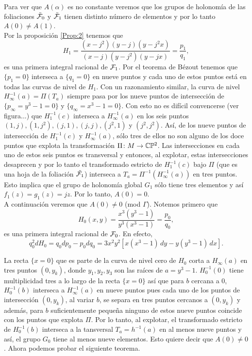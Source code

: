 Para ver que $A(\alpha)$ es no constante veremos que los grupos de holonomía de las foliaciones $\tilde{\mathcal{F}}_{0}$ y $\tilde{\mathcal{F}}_{1}$ tienen distinto número de elementos y por lo tanto $A(0)\neq A(1)$.\\

Por la proposición \ref{Prop:2} tenemos que $$H_{1}=\frac{(x-j^{2})(y-j)(y-j^{2}x)}{(x-j)(y-j^{2})(y-jx)}=\frac{p_{1}}{q_{1}},$$ es una primera integral racional de $\mathcal{F}_{1}$. Por el teorema de Bézout tenemos que $\{p_{1}=0\}$ interseca a $\{q_{1}=0\}$ en nueve puntos y cada uno de estos puntos está en todas las curvas de nivel de $H_{1}$. Con un razonamiento similar, la curva de nivel $H_{\infty}^{-1}(a)=\Pi(T_{a})$ siempre pasa por los nueve puntos de intersección de $\{p_{\infty}=y^{3}-1=0\}$ y $\{q_{\infty}=x^{3}-1=0\}$. Con esto no es difícil convencerse (ver figura...) que $H^{-1}_{1}(c)$ interseca a $H^{-1}_{\infty}(a)$ en los seis puntos $(1,j),(1,j^{2}),(j,1),(j,j),(j^{2},1)$ y $(j^{2},j^{2})$. Así, de los nueve puntos de intersección de $H^{-1}_{1}(c)$ y $H^{-1}_{\infty}(a)$, sólo tres de ellos no son alguno de los doce puntos que explota la transformación $\Pi\colon M\rightarrow\mathbb{C}\mathbb{P}^2$. Las intersecciones en cada uno de estos seis puntos es transversal y entonces, al explotar, estas intersecciones desaprecen y por lo tanto el transformado estricto de $H^{-1}_{1}(c)$ bajo $\Pi$ (que es una hoja de la foliación $\tilde{\mathcal{F}_{1}}$) interseca a $T_{a}=\Pi^{-1}(H^{-1}_{\infty}(a))$ en tres puntos. Esto implica que el grupo de holonomía global $G_{1}$ sólo tiene tres elementos y así $f_{1}(z)=g_{1}(z)=jz$. Por lo tanto, $A(0)=0$.\\

A continuación veremos que $A(0)\neq 0$ (mod $\Gamma$). Notemos primero que $$H_{0}(x,y)=\frac{x^{3}(y^{3}-1)}{y^{3}(x^{3}-1)}=\frac{p_{0}}{q_{0}},$$ es una primera integral racional de $\mathcal{F}_{0}$. En efecto, $$q_{0}^{2}dH_{0}=q_{0}dp_{0}-p_{0}dq_{0}=3x^{2}y^{2}[x(x^{3}-1)\, dy-y(y^{3}-1)\, dx].$$

La recta $\{x=0\}$ que es parte de la curva de nivel cero de $H_{0}$ corta a $H_{\infty}(a)$ en tres puntos $(0,y_{k})$, donde $y_{1},y_{2},y_{3}$ son las raíces de $a=y^{3}-1$. $H_{0}^{-1}(0)$ tiene multiplicidad tres a lo largo de la recta $\{x=0\}$ así que para $b$ cercana a $0$, $H_{0}^{-1}(b)$ interseca a $H_{\infty}^{-1}(a)$ en nueve puntos  pues cada uno de los puntos de intersección $(0,y_{k})$, al variar $b$, se separa en tres puntos cercanos a $(0,y_{k})$ y además, para $b$ suficientemente pequeña ninguno de estos nueve puntos coincide con los puntos que explota $\Pi$. Por lo tanto, al explotar, el transformado estricto de $H_{0}^{-1}(b)$ interseca a la tansversal $T_{a}=h^{-1}(a)$ en al menos nueve puntos y así, el grupo $G_{0}$ tiene al menos nueve elementos. Esto quiere decir que $A(0)\neq 0$. Ahora podemos probar el siguiente teorema.

